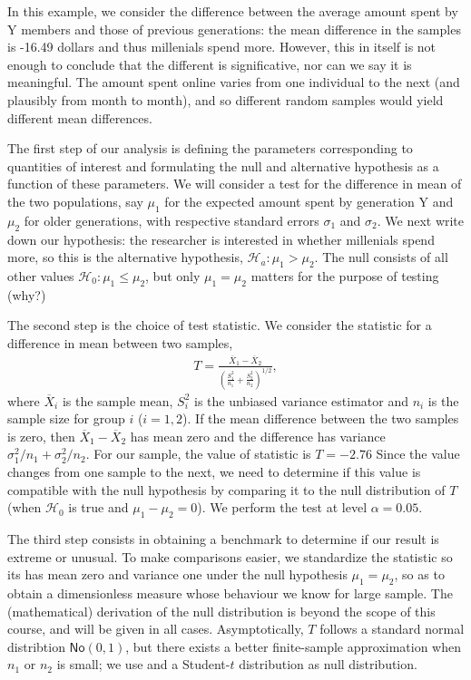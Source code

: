 \documentclass[
  11pt,
  letterpaper,
]{book}
\theoremstyle{definition}
\theoremstyle{definition}
\theoremstyle{definition}
\theoremstyle{remark}
\begin{document}
In this example, we consider the difference between the average amount spent by Y members and those of previous generations: the mean difference in the samples is -16.49 dollars and thus millenials spend more. However, this in itself is not enough to conclude that the different is significative, nor can we say it is meaningful. The amount spent online varies from one individual to the next (and plausibly from month to month), and so different random samples would yield different mean differences.

The first step of our analysis is defining the parameters corresponding to quantities of interest and formulating the null and alternative hypothesis as a function of these parameters. We will consider a test for the difference in mean of the two populations, say \(\mu_1\) for the expected amount spent by generation Y and \(\mu_2\) for older generations, with respective standard errors \(\sigma_1\) and \(\sigma_2\). We next write down our hypothesis: the researcher is interested in whether millenials spend more, so this is the alternative hypothesis, \(\mathscr{H}_a: \mu_1 > \mu_2\). The null consists of all other values \(\mathscr{H}_0: \mu_1 \leq \mu_2\), but only \(\mu_1=\mu_2\) matters for the purpose of testing (why?)

The second step is the choice of test statistic. We consider the \citet{Welch:1947} statistic for a difference in mean between two samples,
\begin{align*}
T = \frac{\overline{X}_1 - \overline{X}_2}{\left(\frac{S_1^2}{n_1}+\frac{S_2^2}{n_2} \right)^{1/2}}, \end{align*}
where \(\overline{X}_i\) is the sample mean, \(S_i^2\) is the unbiased variance estimator and \(n_i\) is the sample size for group \(i\) (\(i=1, 2\)). If the mean difference between the two samples is zero, then \(\overline{X}_1-\overline{X}_2\) has mean zero and the difference has variance \(\sigma^2_1/n_1+\sigma^2_2/n_2\). For our sample, the value of statistic is \(T=-2.76\) Since the value changes from one sample to the next, we need to determine if this value is compatible with the null hypothesis by comparing it to the null distribution of \(T\) (when \(\mathscr{H}_0\) is true and \(\mu_1-\mu_2=0\)). We perform the test at level \(\alpha=0.05\).

The third step consists in obtaining a benchmark to determine if our result is extreme or unusual. To make comparisons easier, we standardize the statistic so its has mean zero and variance one under the null hypothesis \(\mu_1=\mu_2\), so as to obtain a dimensionless measure whose behaviour we know for large sample. The (mathematical) derivation of the null distribution is beyond the scope of this course, and will be given in all cases. Asymptotically, \(T\) follows a standard normal distribtion \(\mathsf{No}(0, 1)\), but there exists a better finite-sample approximation when \(n_1\) or \(n_2\) is small; we use \citet{Satterthwaite:1946} and a Student-\(t\) distribution as null distribution.
\end{document}
